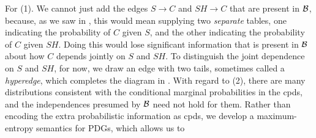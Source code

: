 \documentclass{article}
\theoremstyle{plain}
\theoremstyle{definition}
\newenvironment{example}
	{\pushQED{\qed}\renewcommand{\qedsymbol}{$\triangle$}\examplex}
	{\popQED\endexamplex%
}
\theoremstyle{remark}
\newcommand\PDGof{\Gamma}
\numberwithin{equation}{section}
\begin{document}
\begin{example}[emulating a BN]
For (1). We cannot just add the edges
                $S \to C$ and $SH \to C$ that are present in $\cal B$,
                because, as we saw in , this
                would mean supplying two \emph{separate} tables, one
                indicating the probability of $C$ given $S$, and the
                other indicating the probability of $C$ given
                $\mathit{SH}$.
Doing this would lose significant information that is present in $\cal
B$  about how $C$ depends jointly on $S$ and $SH$.
		To distinguish the joint dependence on $S$ and
                $\mathit{SH}$, for now, we draw an edge with two
                tails, sometimes called a \emph{hyperedge}, which
                completes the diagram in . 
        With regard to (2), there are many
                distributions consistent with the conditional marginal
        probabilities in the cpds, and the independences presumed by
        $\cal B$ need not hold for them. Rather than encoding the
        extra probabilistic information as cpds, we develop a
        maximum-entropy semantics for PDGs, which allows us to

\end{example}
\end{document}
